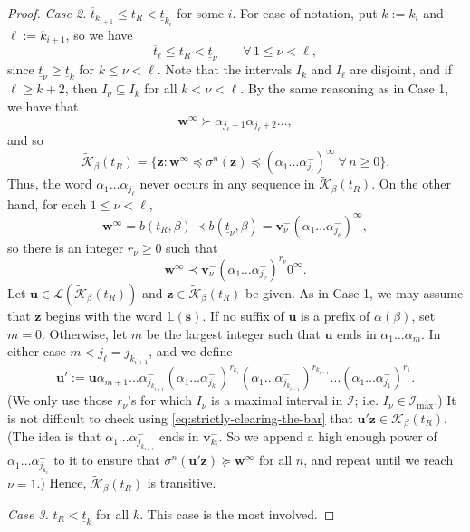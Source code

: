 \documentclass[11pt]{amsart}
\theoremstyle{definition}
\theoremstyle{remark}
\numberwithin{equation}{section}
\renewcommand{\L}{\ensuremath{\mathbb{L}}}
\newcommand{\II}{\mathcal{I}}
\newcommand{\Kt}{\widetilde{\mathcal{K}}}
\newcommand{\s}{ {\mathbf{s}}}
\newcommand{\cL}{\mathcal{L}}
\renewcommand{\u}{\mathbf{u}}
\renewcommand{\v}{\mathbf{v}}
\newcommand{\w}{\mathbf{w}}
\newcommand{\z}{\mathbf{z}}
\newcommand{\f}{\infty}
\newcommand{\al}{\alpha}
\newcommand{\lle}{\preccurlyeq}
\newcommand{\lge}{\succcurlyeq}
\newcommand{\si}{\sigma}
\begin{document}
\begin{proof}
\medskip
{\em Case 2.} $\overline{t}_{k_{i+1}}\leq t_R<\underline{t}_{k_i}$ for some $i$. For ease of notation, put $k:=k_i$ and $\ell:=k_{i+1}$, so we have
\[
\overline{t}_\ell\leq t_R<\underline{t}_\nu \qquad\forall\, 1\leq\nu<\ell,
\]
since $\underline{t}_\nu\geq \underline{t}_k$ for $k\leq\nu<\ell$. {Note that the intervals $I_k$ and $I_\ell$ are disjoint, and if $\ell\geq k+2$, then $I_\nu\subseteq I_k$ for all $k<\nu<\ell$.}
By the same reasoning as in Case 1, we have that
\[
\w^\f\succ \al_{j_\ell+1}\al_{j_\ell+2}\dots,
\]
and so
\[
\Kt_\beta(t_R)=\{\z: \w^\f\lle \si^n(\z)\lle (\al_1\dots\al_{j_\ell}^-)^\f\ \forall\,n\geq 0\}.
\]
Thus, the word $\al_1\dots\al_{j_\ell}$ never occurs in any sequence in $\Kt_\beta(t_R)$. On the other hand, for each $1\leq\nu<\ell$,
\[
\w^\f=b(t_R,\beta)\prec b(\underline{t}_\nu,\beta)=\v_\nu^-(\al_1\dots\al_{j_\nu}^-)^\f,
\]
so there is an integer $r_\nu\geq 0$ such that
\begin{equation} \label{eq:strictly-clearing-the-bar}
\w^\f\prec \v_{\nu}^-(\al_1\dots\al_{j_\nu}^-)^{r_\nu} 0^\f.
\end{equation}
Let $\u\in\cL(\Kt_\beta(t_R))$ and $\z\in\Kt_\beta(t_R)$ be given. As in Case 1, we may assume that $\z$ begins with the word $\L(\s)$. %
If no suffix of $\u$ is a prefix of $\al(\beta)$, set $m=0$. Otherwise, let $m$ be the largest integer such that $\u$ ends in $\al_1\dots\al_m$. In either case {$m<j_\ell=j_{k_{i+1}}$}, and we define %
\[
{\u':=\u\al_{m+1}\dots\al_{j_{k_{i+1}}}^-(\al_1\dots\al_{j_{k_i}}^-)^{r_{k_i}}(\al_1\dots\al_{j_{k_{i-1}}}^-)^{r_{k_{i-1}}}\dots (\al_1\dots\al_{j_1}^-)^{r_1}.}
\]
{(We only use those $r_\nu$'s for which $I_\nu$ is a maximal interval in $\mathcal{I}$; i.e. $I_\nu\in\II_{\max}$.)}
It is not difficult to check using \eqref{eq:strictly-clearing-the-bar} that $\u'\z\in\Kt_\beta(t_R)$. (The idea is that {$\al_1\dots\al_{j_{k_{i+1}}}^-$ ends in $\v_{k_i}^-$. So we append a high enough power of $\al_1\dots\al_{j_{k_i}}^-$} to it to ensure that $\si^n(\u'\z)\lge \w^\f$ for all $n$, and repeat until we reach $\nu=1$.) Hence, $\Kt_\beta(t_R)$ is transitive.

\medskip
{\em Case 3.} $t_R<\underline{t}_k$ for all $k$. This case is the most involved.


\end{proof}
\end{document}
